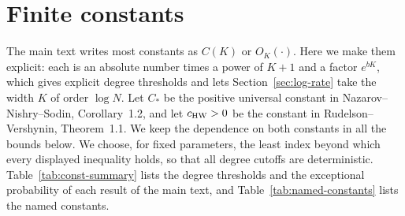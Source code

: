 \section{Finite constants}\label{sec:constants}\label{app:coefficient-finite}
The main text writes most constants as $C(K)$ or $O_K(\cdot)$. Here we
make them explicit: each is an absolute number times a power of $K+1$
and a factor $e^{bK}$, which gives explicit degree thresholds and lets
Section~\ref{sec:log-rate} take the width $K$ of order $\log N$.
Let $C_*$ be the positive universal constant in
Nazarov--Nishry--Sodin, Corollary~1.2, and let $c_{\rm HW}>0$ be the
constant in Rudelson--Vershynin, Theorem~1.1.
We keep the dependence on both constants in all the bounds below.
We choose, for fixed parameters, the least index beyond which every
displayed inequality holds, so that all degree cutoffs are deterministic.
Table~\ref{tab:const-summary} lists the degree thresholds and the
exceptional probability of each result of the main text, and
Table~\ref{tab:named-constants} lists the named constants.

